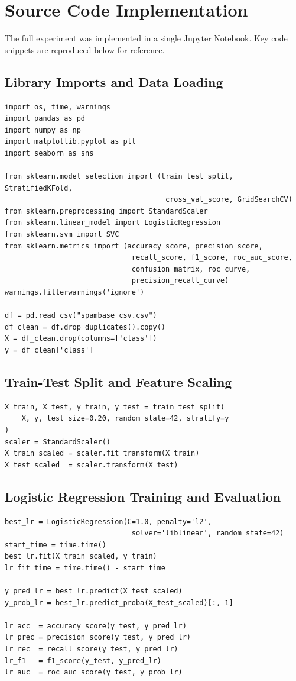 \documentclass[12pt,a4paper]{article}
\begin{document}
\section{Source Code Implementation}

The full experiment was implemented in a single Jupyter Notebook. Key code snippets are reproduced below for reference.

\subsection*{Library Imports and Data Loading}
\begin{lstlisting}
import os, time, warnings
import pandas as pd
import numpy as np
import matplotlib.pyplot as plt
import seaborn as sns

from sklearn.model_selection import (train_test_split, StratifiedKFold,
                                      cross_val_score, GridSearchCV)
from sklearn.preprocessing import StandardScaler
from sklearn.linear_model import LogisticRegression
from sklearn.svm import SVC
from sklearn.metrics import (accuracy_score, precision_score,
                              recall_score, f1_score, roc_auc_score,
                              confusion_matrix, roc_curve,
                              precision_recall_curve)
warnings.filterwarnings('ignore')

df = pd.read_csv("spambase_csv.csv")
df_clean = df.drop_duplicates().copy()
X = df_clean.drop(columns=['class'])
y = df_clean['class']
\end{lstlisting}

\subsection*{Train-Test Split and Feature Scaling}
\begin{lstlisting}
X_train, X_test, y_train, y_test = train_test_split(
    X, y, test_size=0.20, random_state=42, stratify=y
)
scaler = StandardScaler()
X_train_scaled = scaler.fit_transform(X_train)
X_test_scaled  = scaler.transform(X_test)
\end{lstlisting}

\subsection*{Logistic Regression Training and Evaluation}
\begin{lstlisting}
best_lr = LogisticRegression(C=1.0, penalty='l2',
                              solver='liblinear', random_state=42)
start_time = time.time()
best_lr.fit(X_train_scaled, y_train)
lr_fit_time = time.time() - start_time

y_pred_lr = best_lr.predict(X_test_scaled)
y_prob_lr = best_lr.predict_proba(X_test_scaled)[:, 1]

lr_acc  = accuracy_score(y_test, y_pred_lr)
lr_prec = precision_score(y_test, y_pred_lr)
lr_rec  = recall_score(y_test, y_pred_lr)
lr_f1   = f1_score(y_test, y_pred_lr)
lr_auc  = roc_auc_score(y_test, y_prob_lr)
\end{lstlisting}
\end{document}
